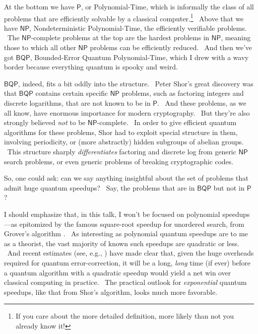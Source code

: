 \documentclass[11pt]{article}
\begin{document}
At the bottom we have $\mathsf{P}$, or Polynomial-Time, which is informally the class of all problems that are efficiently solvable by a classical computer.\footnote{If you care about the more detailed definition, more likely than not you already know it!} \ Above that we have $\mathsf{NP}$, Nondeterministic Polynomial-Time, the efficiently verifiable problems. \ The $\mathsf{NP}$-complete problems at the top are the hardest problems in $\mathsf{NP}$, meaning those to which all other $\mathsf{NP}$ problems can be efficiently reduced. \ And then we've got $\mathsf{BQP}$, Bounded-Error Quantum Polynomial-Time, which I drew with a wavy border because everything quantum is spooky and weird.

$\mathsf{BQP}$, indeed, fits a bit oddly into the structure. \ Peter Shor's great discovery \cite{shor} was that $\mathsf{BQP}$ contains certain specific $\mathsf{NP}$ problems, such as factoring integers and discrete logarithms, that are not known to be in $\mathsf{P}$. \ And these problems, as we all know, have enormous importance for modern cryptography. \ But they're also strongly believed \emph{not} to be $\mathsf{NP}$-complete. \ In order to give efficient quantum algorithms for these problems, Shor had to exploit special structure in them, involving periodicity, or (more abstractly) hidden subgroups of abelian groups. \ This structure sharply \emph{differentiates} factoring and discrete log from generic $\mathsf{NP}$ search problems, or even generic problems of breaking cryptographic codes.

So, one could ask: can we say anything insightful about the set of problems that admit huge quantum speedups? \ Say, the problems that are in $\mathsf{BQP}$ but not in $\mathsf{P}$?

I should emphasize that, in this talk, I won't be focused on polynomial speedups---as epitomized by the famous square-root speedup for unordered search, from Grover's algorithm \cite{grover}. \ As interesting as polynomial quantum speedups are to me as a theorist, the vast majority of known such speedups are quadratic or less. \ And recent estimates (see, e.g., \cite{babbush:beyondquadratic}) have made clear that, given the huge overheads required for quantum error-correction, it will be a long, \emph{long} time (if ever) before a quantum algorithm with a quadratic speedup would yield a net win over classical computing in practice. \ The practical outlook for \emph{exponential} quantum speedups, like that from Shor's algorithm, looks much more favorable.
\end{document}
